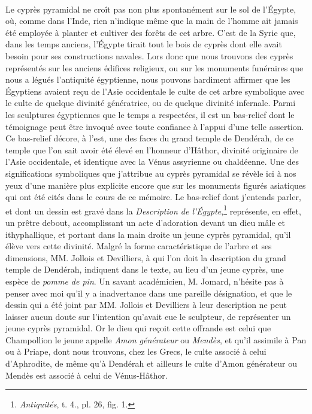\documentclass[a4paper, 11pt, oneside, polutonikogreek, french]{article}
\begin{document}
\paragraph{}
Le cyprès pyramidal ne croît pas non plus spontanément sur le sol de l'Égypte, où, comme dans l'Inde, rien n'indique même que la main de l'homme ait jamais été employée à planter et cultiver des forêts de cet arbre. C'est de la Syrie que, dans les temps anciens, l'Égypte tirait tout le bois de cyprès dont elle avait besoin pour ses constructions navales. Lors donc que nous trouvons des cyprès représentés sur les anciens édifices religieux, ou sur les monuments funéraires que nous a légués l'antiquité égyptienne, nous pouvons hardiment affirmer que les Égyptiens avaient reçu de l'Asie occidentale le culte de cet arbre symbolique avec le culte de quelque divinité génératrice, ou de quelque divinité infernale. Parmi les sculptures égyptiennes que le temps a respectées, il est un bas-relief dont le témoignage peut être invoqué avec toute confiance à l'appui d'une telle assertion. Ce bas-relief décore, à l'est, une des faces du grand temple de Dendérah, de ce temple que l'on sait avoir été élevé en l'honneur d'Hâthor, divinité originaire de l'Asie occidentale, et identique avec la Vénus assyrienne ou chaldéenne. Une des significations symboliques que j'attribue au cyprès pyramidal se révèle ici à nos yeux d'une manière plus explicite encore que sur les monuments figurés asiatiques qui ont été cités dans le cours de ce mémoire. Le bas-relief dont j'entends parler, et dont un dessin est gravé dans la \emph{Description de l'Égypte},\footnote{\emph{Antiquités}, t. 4., pl. 26, fig. 1.} représente, en effet, un prêtre debout, accomplissant un acte d'adoration devant un dieu mâle et ithyphallique, et portant dans la main droite un jeune cyprès pyramidal, qu'il élève vers cette divinité. Malgré la forme caractéristique de l'arbre et ses dimensions, MM. Jollois et Devilliers, à qui l'on doit la description du grand temple de Dendérah, indiquent dans le texte, au lieu d'un jeune cyprès, une espèce de \emph{pomme de pin}. Un savant académicien, M. Jomard, n'hésite pas à penser avec moi qu'il y a inadvertance dans une pareille désignation, et que le dessin qui a été joint par MM. Jollois et Devilliers à leur description ne peut laisser aucun doute sur l'intention qu'avait eue le sculpteur, de représenter un jeune cyprès pyramidal. Or le dieu qui reçoit cette offrande est celui que Champollion le jeune appelle \emph{Amon générateur} ou \emph{Mendès}, et qu'il assimile à Pan ou à Priape, dont nous trouvons, chez les Grecs, le culte associé à celui d'Aphrodite, de même qu'à Dendérah et ailleurs le culte d'Amon générateur ou Mendès est associé à celui de Vénus-Hâthor.
\end{document}
